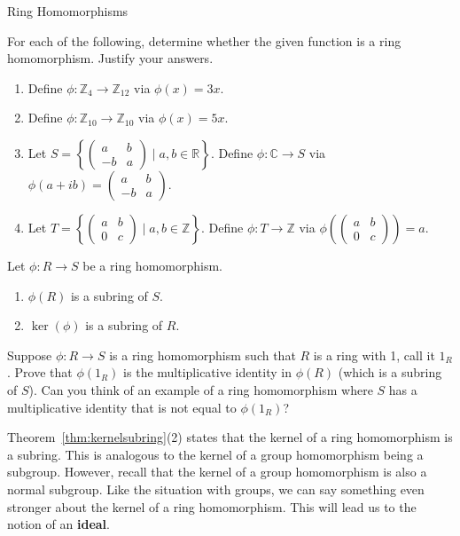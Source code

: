 \begin{section}{Ring Homomorphisms}
\begin{exercise}
For each of the following, determine whether the given function is a ring homomorphism.  Justify your answers.
\begin{enumerate}[label=\rm{(\alph*)}]
\item Define $\phi:\mathbb{Z}_4\to \mathbb{Z}_{12}$ via $\phi(x)=3x$.
\item Define $\phi:\mathbb{Z}_{10}\to \mathbb{Z}_{10}$ via $\phi(x)=5x$.
\item Let $\displaystyle S=\left\{\begin{pmatrix}a & b\\ -b & a\end{pmatrix}\mid a, b\in \mathbb{R}\right\}$.  Define $\phi:\mathbb{C}\to S$ via $\displaystyle \phi(a+ib)=\begin{pmatrix}a & b\\ -b & a\end{pmatrix}$.
\item Let $\displaystyle T=\left\{\begin{pmatrix}a & b\\ 0 & c\end{pmatrix}\mid a, b\in \mathbb{Z}\right\}$. Define $\phi:T\to \mathbb{Z}$ via $\displaystyle \phi\left(\begin{pmatrix}a & b\\ 0 & c\end{pmatrix}\right)=a$.
\end{enumerate}
\end{exercise}

\begin{theorem}\label{thm:kernelsubring}
Let $\phi:R\to S$ be a ring homomorphism.
\begin{enumerate}
\item $\phi(R)$ is a subring of $S$.
\item $\ker(\phi)$ is a subring of $R$.
\end{enumerate}
\end{theorem}

\begin{problem}
Suppose $\phi:R\to S$ is a ring homomorphism such that $R$ is a ring with 1, call it $1_R$.  Prove that $\phi(1_R)$ is the multiplicative identity in $\phi(R)$ (which is a subring of $S$).  Can you think of an example of a ring homomorphism where $S$ has a multiplicative identity that is not equal to $\phi(1_R)$?
\end{problem}

Theorem~\ref{thm:kernelsubring}(2) states that the kernel of a ring homomorphism is a subring. This is analogous to the kernel of a group homomorphism being a subgroup. However, recall that the kernel of a group homomorphism is also a normal subgroup. Like the situation with groups, we can say something even stronger about the kernel of a ring homomorphism. This will lead us to the notion of an \textbf{ideal}.


\end{section}

